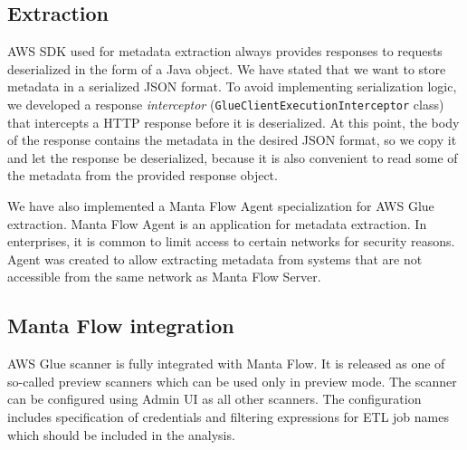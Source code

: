 \subsection{Extraction}
AWS SDK used for metadata extraction always provides responses to requests deserialized in the form of a Java object. We have stated that we want to store metadata in a serialized JSON format. To avoid implementing serialization logic, we developed a response \textit{interceptor} (\texttt{GlueClientExecutionInterceptor} class) that intercepts a HTTP response before it is deserialized. At this point, the body of the response contains the metadata in the desired JSON format, so we copy it and let the response be deserialized, because it is also convenient to read some of the metadata from the provided response object.
\par
We have also implemented a Manta Flow Agent specialization for AWS Glue extraction. Manta Flow Agent is an application for metadata extraction. In enterprises, it is common to limit access to certain networks for security reasons. Agent was created to allow extracting metadata from systems that are not accessible from the same network as Manta Flow Server.

\subsection{Manta Flow integration}
AWS Glue scanner is fully integrated with Manta Flow. It is released as one of so-called preview scanners which can be used only in preview mode. The scanner can be configured using Admin UI as all other scanners. The configuration includes specification of credentials and filtering expressions for ETL job names which should be included in the analysis.

 

 